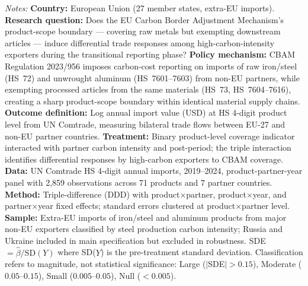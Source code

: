 \begin{table}[htbp]
\begin{threeparttable}
\begin{tablenotes}[flushleft]
\item \textit{Notes:} \textbf{Country:} European Union (27 member states, extra-EU imports). \textbf{Research question:} Does the EU Carbon Border Adjustment Mechanism's product-scope boundary --- covering raw metals but exempting downstream articles --- induce differential trade responses among high-carbon-intensity exporters during the transitional reporting phase? \textbf{Policy mechanism:} CBAM Regulation 2023/956 imposes carbon-cost reporting on imports of raw iron/steel (HS~72) and unwrought aluminum (HS~7601--7603) from non-EU partners, while exempting processed articles from the same materials (HS~73, HS~7604--7616), creating a sharp product-scope boundary within identical material supply chains. \textbf{Outcome definition:} Log annual import value (USD) at HS 4-digit product level from UN Comtrade, measuring bilateral trade flows between EU-27 and non-EU partner countries. \textbf{Treatment:} Binary product-level coverage indicator interacted with partner carbon intensity and post-period; the triple interaction identifies differential responses by high-carbon exporters to CBAM coverage. \textbf{Data:} UN Comtrade HS 4-digit annual imports, 2019--2024, product-partner-year panel with 2,859 observations across 71 products and 7 partner countries. \textbf{Method:} Triple-difference (DDD) with product$\times$partner, product$\times$year, and partner$\times$year fixed effects; standard errors clustered at product$\times$partner level. \textbf{Sample:} Extra-EU imports of iron/steel and aluminum products from major non-EU exporters classified by steel production carbon intensity; Russia and Ukraine included in main specification but excluded in robustness. SDE $= \hat{\beta} / \text{SD}(Y)$ where SD($Y$) is the pre-treatment standard deviation. Classification refers to magnitude, not statistical significance: Large ($|$SDE$| > 0.15$), Moderate ($0.05$--$0.15$), Small ($0.005$--$0.05$), Null ($< 0.005$).
\end{tablenotes}
\end{threeparttable}
\end{table}

